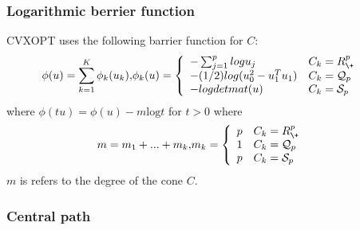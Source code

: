 \subsubsection*{Logarithmic berrier function}
CVXOPT uses the following barrier function for $C$:
\begin{equation*}
	\begin{aligned}
		\phi(u)=\sum_{k=1}^{K}\phi_k(u_k), & \phi_k(u)=
		\left\{
                \begin{array}{ll}
                  -\sum_{j=1}^{p} log u_j & C_k=R_{\+}^p \\
                  -(1/2)log(u_0^2-u_1^Tu_1) & C_k=\mathcal{Q}_p \\
                  -log{ det } mat(u) & C_k = \mathcal{S}_p
                \end{array}
              \right.
	\end{aligned}
\end{equation*}
where $\phi(tu) = \phi(u) - m\text{log}t$ for $t>0$ where
\begin{equation*}
	\begin{aligned}
		m = m_1+...+m_k, & m_k=
		\left\{
                \begin{array}{ll}
                  p & C_k=R_{\+}^p \\
                  1 & C_k=\mathcal{Q}_p \\
                  p & C_k = \mathcal{S}_p
                \end{array}
              \right.
	\end{aligned}
\end{equation*}
$m$ is refers to the degree of the cone $C$.

\subsubsection*{Central path}

